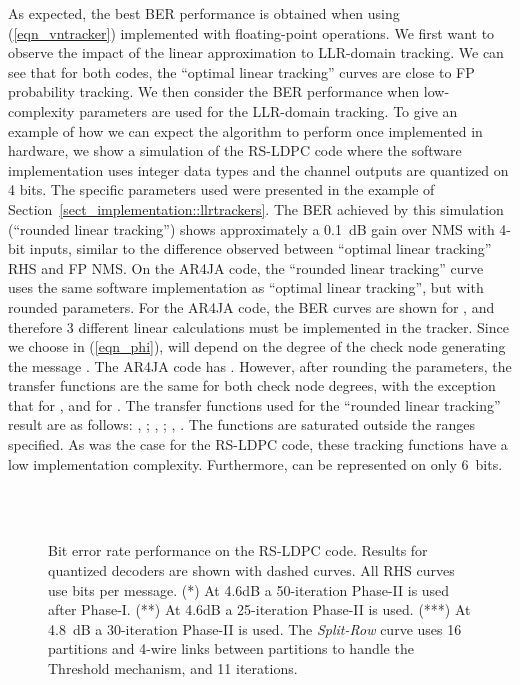 \documentclass[12pt,journal,twoside,draftcls,onecolumn]{IEEEtran}
\begin{document}
As expected, the best BER performance is obtained when using (\ref{eqn_vntracker}) implemented with floating-point operations. We first want to observe the impact of the linear approximation to LLR-domain tracking. We can see that for both codes, the ``optimal linear tracking'' curves are close to FP probability tracking. 
We then consider the BER performance when low-complexity parameters are used for the LLR-domain tracking. To give an example of how we can expect the algorithm to perform once implemented in hardware, we show a simulation of the RS-LDPC code where the software implementation uses integer data types and the channel outputs are quantized on 4 bits. The specific parameters used were presented in the example of Section~\ref{sect_implementation::llrtrackers}. The BER achieved by this simulation (``rounded linear tracking'') shows approximately a 0.1~dB gain over NMS with 4-bit inputs, similar to the difference observed between ``optimal linear tracking'' RHS and FP NMS.
On the AR4JA code, the ``rounded linear tracking'' curve uses the same software implementation as ``optimal linear tracking'', but with rounded parameters. For the AR4JA code, the BER curves are shown for , and therefore 3 different linear calculations must be implemented in the tracker. 
Since we choose  in (\ref{eqn_phi}),  will depend on the degree  of the check node generating the message . 
The AR4JA code has . However, after rounding the parameters, the transfer functions are the same for both check node degrees, with the exception that  for , and  for . The transfer functions used for the ``rounded linear tracking'' result are as follows:
, ;
, ;
, .
The functions are saturated outside the ranges specified. As was the case for the RS-LDPC code, these tracking functions have a low implementation complexity. Furthermore,  can be represented on only 6~bits.


\begin{figure}[tbp]
\begin{center}
\ifCLASSOPTIONdraftcls
	 \\
\else
	 \\
\fi
\caption{{Bit error rate performance on the RS-LDPC code. Results for quantized decoders are shown with dashed curves. All RHS curves use  bits per message. (*) At 4.6dB a 50-iteration Phase-II is used after Phase-I. (**) At 4.6dB a 25-iteration Phase-II is used. (***) At 4.8~dB a 30-iteration Phase-II is used.
The \emph{Split-Row} curve \cite{mohsenin:2010} uses 16 partitions and 4-wire links between partitions to handle the Threshold mechanism, and 11 iterations.}}
\end{center}
\end{figure}
\end{document}
